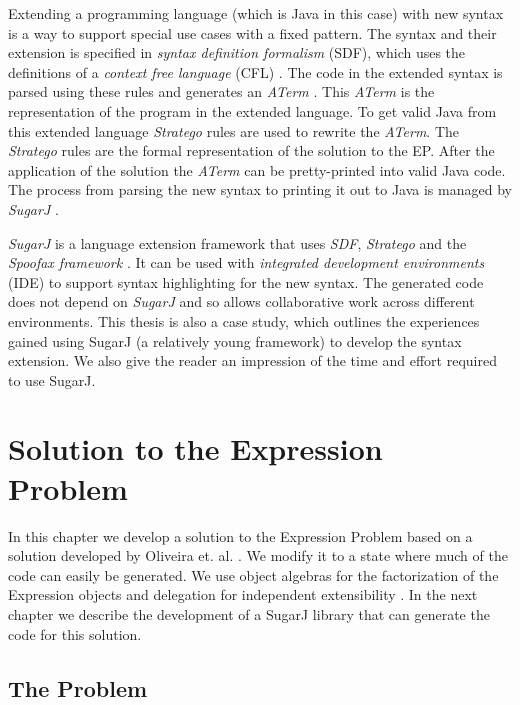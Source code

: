 \documentclass{report}
\begin{document}
Extending a programming language (which is Java in this case) with new syntax is a way to support special use cases with a fixed pattern. The syntax and their extension is specified in \emph{syntax definition formalism} (SDF), which uses the definitions of a \emph{context free language} (CFL) \cite{Heering-SDF-1989}. The code in the extended syntax is parsed using these rules and generates an \emph{ATerm} \cite{Brand-ATerms-2000}. This \emph{ATerm} is the representation of the program in the extended language. To get valid Java from this extended language \emph{Stratego} rules are used to rewrite the \emph{ATerm}. The \emph{Stratego} rules are the formal representation of the solution to the EP. After the application of the solution the \emph{ATerm} can be pretty-printed into valid Java code. The process from parsing the new syntax to printing it out to Java is managed by \emph{SugarJ} \cite{Erdweg-SugarJ-2011}.

\emph{SugarJ} is a language extension framework that uses \emph{SDF}, \emph{Stratego} and the \emph{Spoofax framework} \cite{Kats-Spoofax-2010}. It can be used with \emph{integrated development environments} (IDE) to support syntax highlighting for the new syntax. The generated code does not depend on \emph{SugarJ} and so allows collaborative work across different environments. This thesis is also a case study, which outlines the experiences gained using SugarJ (a relatively young framework) to develop the syntax extension. We also give the reader an impression of the time and effort required to use SugarJ.


\chapter{Solution to the Expression Problem}

In this chapter we develop a solution to the Expression Problem based on a solution developed by Oliveira et. al. \cite{Oliv-Extensibility-2012}. We modify it to a state where much of the code can easily be generated. We use object algebras for the factorization of the Expression objects and delegation for independent extensibility \cite{Tempero-Multiple-2000}. In the next chapter we describe the development of a SugarJ library that can generate the code for this solution.


\section{The Problem}
\label{theProblem}
\end{document}
